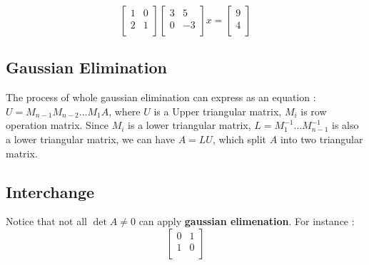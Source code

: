 \[
    \begin{bmatrix}
        1 & 0 \\ 
        2 & 1 \\ 
    \end{bmatrix}
    \begin{bmatrix}
        3 & 5 \\ 
        0 & -3 \\ 
    \end{bmatrix}
    x=\begin{bmatrix}9 \\ 4 \\ \end{bmatrix}
\]

\subsection{Gaussian Elimination}

The process of whole gaussian elimination can express as an equation :
$U = M_{n-1}M_{n-2} \dots M_1 A $, where $U$ is a Upper triangular matrix,
$M_i$ is row operation matrix. Since $M_i$ is a lower triangular matrix,
$L = M_1^{-1} \dots M_{n-1}^{-1}$ is also a lower triangular matrix,
we can have $A = LU$, which split $A$ into two triangular matrix.

\subsection{Interchange}

Notice that not all $\det A \neq 0$ can apply \textbf{gaussian elimenation}.
For instance : 
\[
    \begin{bmatrix}
        0 & 1 \\
        1 & 0 \\
    \end{bmatrix}
\]
